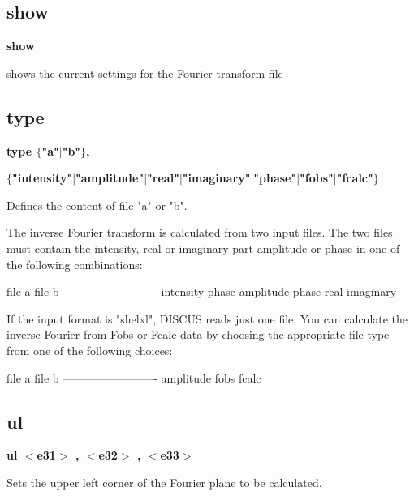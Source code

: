\subsection*{show}
{\bf show \par }
\par
\vspace{3pt}
shows the current settings for the Fourier transform file 
\subsection*{type}
{\bf type $ \{$"a"$| $"b"$\} $, \par }
{\bf      $ \{$"intensity"$| $"amplitude"$| $"real"$| $"imaginary"$| $"phase"$| $"fobs"$| $"fcalc"$\} $ \par }
\par
\vspace{3pt}
Defines the content of file "a" or "b". 
\par
The inverse Fourier transform is calculated from two input files. 
The two files must contain the intensity, real or imaginary part 
amplitude or phase in one of the following combinations: 
\par
\begin{MacVerbatim}
file a          file b
-------------------------
intensity       phase
amplitude       phase
real            imaginary
\end{MacVerbatim}
If the input format is "shelxl", DISCUS reads just one file. You can 
calculate the inverse Fourier from Fobs or Fcalc data by choosing the 
appropriate file type from one of the following choices: 
\par
\begin{MacVerbatim}
file a          file b
-------------------------
amplitude
fobs
fcalc
\end{MacVerbatim}
\subsection*{ul}
{\bf ul $ <$e31$> $ , $ <$e32$> $ , $ <$e33$> $ \par }
\par
\vspace{3pt}
Sets the upper left corner of the Fourier plane to be calculated. 
